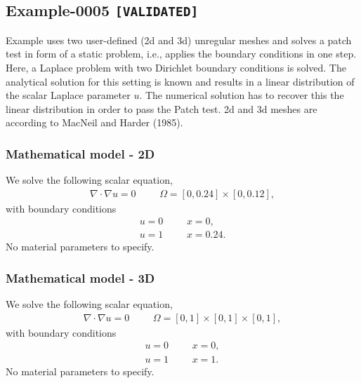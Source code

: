 %
\clearpage
%
\subsection{Example-0005 \texttt{[VALIDATED]}}
%
Example uses two user-defined (2d and 3d) unregular meshes and solves a patch test  in form of a static problem, i.e., applies
the boundary conditions in one step.
Here, a Laplace problem with two Dirichlet boundary conditions is solved.
The analytical solution for this setting is known and results in a linear distribution of the scalar Laplace parameter $u$.
The numerical solution has to recover this the linear distribution in order to pass the Patch test.
2d and 3d meshes are according to MacNeil and Harder (1985).
%
%
\subsubsection{Mathematical model - 2D}
%
We solve the following scalar equation,
%
\begin{align}
    \nabla \cdot \nabla u = 0 & &&\Omega = [0, 0.24] \times [0, 0.12],
\end{align}
%
with boundary conditions
%
\begin{align}
    u = 0      & &&x = 0, \\
    u = 1      & &&x = 0.24.
\end{align}
%
No material parameters to specify.
%
%
\subsubsection{Mathematical model - 3D}
%
We solve the following scalar equation,
%
\begin{align}
    \nabla \cdot \nabla u = 0 & &&\Omega = [0, 1] \times [0, 1] \times [0, 1],
\end{align}
%
with boundary conditions
%
\begin{align}
    u = 0      & &&x = 0, \\
    u = 1      & &&x = 1.
\end{align}
%
No material parameters to specify.
%
%
